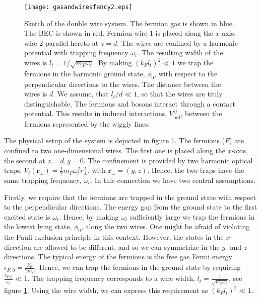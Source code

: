 \begin{figure} 
\begin{center}  
\texttt{[image: gasandwiresfancy2.eps]}  
\caption{Sketch of the double wire system. The fermion gas is shown in blue. The BEC is shown in red. Fermion wire 1 is placed along the $x$-axis, wire 2 parallel hereto at $z = d$. The wires are confined by a harmonic potential with trapping frequency $\omega_t$. The resulting width of the wires is $l_t = 1/\sqrt{m_F\omega_t}$. By making $(k_Fl_t)^2 \ll 1$ we trap the fermions in the harmonic ground state, $\phi_0$, with respect to the perpendicular directions to the wires. The distance between the wires is $d$. We assume, that $l_t / d \ll 1$, so that the wires are truly distinguishable. The fermions and bosons interact through a contact potential. This results in induced interactions, $V^{ij}_{\text{ind}}$, between the fermions represented by the wiggly lines.}  
\label{fig.gasandwires}  
\end{center}    
\end{figure}

The physical setup of the system is depicted in figure \ref{fig.gasandwires}. The fermions ($F$) are confined to two one-dimensional wires. The first one is placed along the $x$-axis, the second at $z = d, y = 0$. The confinement is provided by two harmonic optical traps, $V_t(\mathbf{r}_{\perp}) = \frac{1}{2}m_F\omega_t^2r_{\perp}^2$, with $\mathbf{r}_{\perp} = (y, z)$. Hence, the two traps have the same trapping frequency, $\omega_t$. In this connection we have two central assumptions. 

Firstly, we require that the fermions are trapped in the ground state with respect to the perpendicular directions. The energy gap from the ground state to the first excited state is $\omega_t$. Hence, by making $\omega_t$ sufficiently large we trap the fermions in the lowest lying state, $\phi_0$, along the two wires. One might be afraid of violating the Pauli exclusion principle in this context. However, the states in the $x$-direction are allowed to be different, and so we can symmetrize in the $y$- and $z$-directions. The typical energy of the fermions is the free gas Fermi energy $\epsilon_{F,0} = \frac{k_F^2}{2m_F}$. Hence, we can trap the fermions in the ground state by requiring $\frac{\epsilon_{F,0}}{\omega_t} \ll 1$. The trapping frequency corresponds to a wire width, $l_t = \frac{1}{\sqrt{m_F\omega_t}}$, see figure \ref{fig.gasandwires}. Using the wire width, we can express this requirement as $(k_Fl_t)^2 \ll 1$. 


